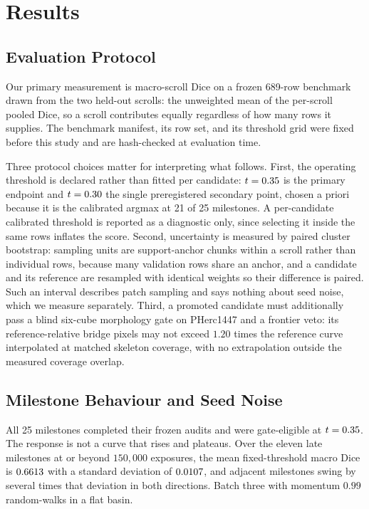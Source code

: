 \section{Results}
\label{sec:results}

\subsection{Evaluation Protocol}

Our primary measurement is macro-scroll Dice on a frozen 689-row benchmark
drawn from the two held-out scrolls: the unweighted mean of the per-scroll
pooled Dice, so a scroll contributes equally regardless of how many rows it
supplies.
The benchmark manifest, its row set, and its threshold grid were fixed before
this study and are hash-checked at evaluation time.

Three protocol choices matter for interpreting what follows.
First, the operating threshold is declared rather than fitted per candidate:
$t=0.35$ is the primary endpoint and $t=0.30$ the single
preregistered secondary point, chosen a priori because it is the calibrated
argmax at 21 of 25 milestones.
A per-candidate calibrated threshold is reported as a diagnostic only, since
selecting it inside the same rows inflates the score.
Second, uncertainty is measured by paired cluster bootstrap: sampling units are
support-anchor chunks within a scroll rather than individual rows, because many
validation rows share an anchor, and a candidate and its reference are resampled
with identical weights so their difference is paired.
Such an interval describes patch sampling and says nothing about seed noise,
which we measure separately.
Third, a promoted candidate must additionally pass a blind six-cube morphology
gate on PHerc1447 and a frontier veto: its reference-relative bridge pixels may
not exceed $1.20$ times the reference curve interpolated at matched skeleton
coverage, with no extrapolation outside the measured coverage overlap.

\subsection{Milestone Behaviour and Seed Noise}

All 25 milestones completed their frozen audits and were gate-eligible at
$t=0.35$.
The response is not a curve that rises and plateaus.
Over the eleven late milestones at or beyond $150{,}000$ exposures, the mean
fixed-threshold macro Dice is $0.6613$ with a standard deviation of
$0.0107$, and adjacent milestones swing by several times that deviation in
both directions.
Batch three with momentum $0.99$ random-walks in a flat basin.

